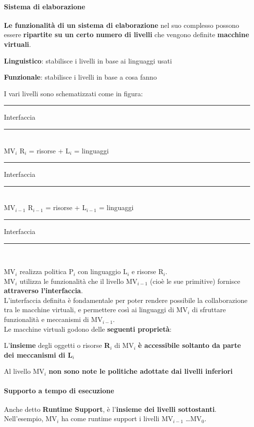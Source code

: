 \documentclass[10pt]{report}
\begin{document}
\paragraph{Sistema di elaborazione} \textbf{Le funzionalità di un sistema di elaborazione} nel suo complesso possono essere \textbf{ripartite su un certo numero di livelli} che vengono definite \textbf{macchine virtuali}. \begin{list}{-}{La suddivisione può seguire \textbf{due approcci} fondamentali:}
	\item \textbf{Linguistico}: stabilisce i livelli in base ai linguaggi usati
	\item \textbf{Funzionale}: stabilisce i livelli in base a cosa fanno
\end{list}
I vari livelli sono schematizzati come in figura:
\begin{center}
\rule{5cm}{1pt} Interfaccia \rule{5cm}{1pt}\\
MV$_{i}$	R$_{i}$ = {risorse} + L$_{i}$ = {linguaggi}\\
\rule{5cm}{1pt} Interfaccia \rule{5cm}{1pt}\\
MV$_{i-1}$	R$_{i-1}$ = {risorse} + L$_{i-1}$ = {linguaggi}\\
\rule{5cm}{1pt} Interfaccia \rule{5cm}{1pt}\\
\end{center}
MV$_{i}$ realizza politica P$_{i}$ con linguaggio L$_{i}$ e risorse R$_{i}$.\\
MV$_{i}$ utilizza le funzionalità che il livello MV$_{i-1}$ (cioè le sue primitive) fornisce \textbf{attraverso l'interfaccia}.\\
L'interfaccia definita è fondamentale per poter rendere possibile la collaborazione tra le macchine virtuali, e permettere così ai linguaggi di MV$_{i}$ di sfruttare funzionalità e meccanismi di MV$_{i-1}$.\\
Le macchine virtuali godono delle \textbf{seguenti proprietà}:
\begin{list}{}{}
	\item L'\textbf{insieme} degli oggetti o risorse \textbf{R}$_{i}$ di MV$_{i}$ \textbf{è accessibile soltanto da parte dei meccanismi di L}$_{i}$ 
	\item Al livello MV$_{i}$ \textbf{non sono note le politiche adottate dai livelli inferiori}
\end{list}
\paragraph{Supporto a tempo di esecuzione} Anche detto \textbf{Runtime Support}, è l'\textbf{insieme dei livelli sottostanti}.\\
Nell'esempio, MV$_{i}$ ha come runtime support i livelli MV$_{i-1}$ \ldots MV$_{0}$.
\end{document}
